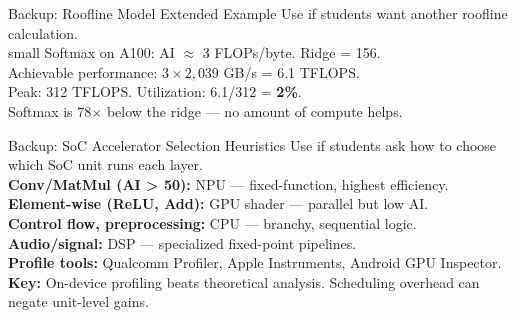 \documentclass[aspectratio=169, 12pt]{beamer}
\begin{document}
\appendix

\begin{frame}{Backup: Roofline Model Extended Example}
\small
Use if students want another roofline calculation.\\small Softmax on A100: AI $\approx$ 3 FLOPs/byte. Ridge = 156.\\ Achievable performance: $3 \times 2{,}039$ GB/s = 6.1 TFLOPS.\\ Peak: 312 TFLOPS. Utilization: 6.1/312 = \textbf{2\%}.\\ Softmax is 78$\times$ below the ridge --- no amount of compute helps.
\end{frame}

\begin{frame}{Backup: SoC Accelerator Selection Heuristics}
\small
Use if students ask how to choose which SoC unit runs each layer.\\[0.1cm]
{\footnotesize
\textbf{Conv/MatMul (AI > 50):} NPU --- fixed-function, highest efficiency.\\
\textbf{Element-wise (ReLU, Add):} GPU shader --- parallel but low AI.\\
\textbf{Control flow, preprocessing:} CPU --- branchy, sequential logic.\\
\textbf{Audio/signal:} DSP --- specialized fixed-point pipelines.\\[0.05cm]
\textbf{Profile tools:} Qualcomm Profiler, Apple Instruments, Android GPU Inspector.\\
\textbf{Key:} On-device profiling beats theoretical analysis. Scheduling overhead can negate unit-level gains.
}
\end{frame}
\end{document}

